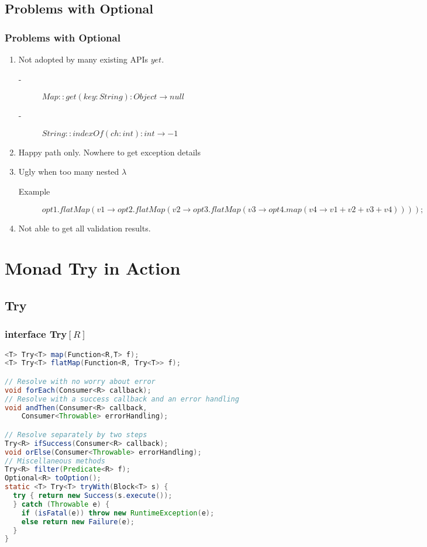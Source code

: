 \documentclass{beamer}
\begin{document}
\subsection{Problems with Optional}
\begin{frame}
  \frametitle{Problems with Optional}
    \begin{enumerate}
    \item Not adopted by many existing APIs $yet$.
      \begin{description}
      \item[-] $Map::get(key: String): Object \rightarrow null $
      \item[-] $String::indexOf(ch: int): int \rightarrow -1$
      \end{description}
    \item Happy path only. Nowhere to get exception details
    \item Ugly when too many nested \alert{$\lambda$}
        \begin{description}
        \item[Example] $opt1.flatMap(v1 \rightarrow opt2.flatMap(v2 \rightarrow opt3.flatMap(v3 \rightarrow opt4.map(v4 \rightarrow v1 + v2 + v3 + v4))));$
        \end{description}
    \item Not able to get all validation results.
    \end{enumerate}
\end{frame}
  
\section{Monad Try in Action}
\subsection{Try}
\begin{frame}[fragile]
  \frametitle{interface Try$\left[R \right]$}
\begin{lstlisting}[language=Java]
<T> Try<T> map(Function<R,T> f);
<T> Try<T> flatMap(Function<R, Try<T>> f);

// Resolve with no worry about error
void forEach(Consumer<R> callback);
// Resolve with a success callback and an error handling
void andThen(Consumer<R> callback, 
    Consumer<Throwable> errorHandling);

// Resolve separately by two steps
Try<R> ifSuccess(Consumer<R> callback);
void orElse(Consumer<Throwable> errorHandling);
// Miscellaneous methods
Try<R> filter(Predicate<R> f);
Optional<R> toOption();
static <T> Try<T> tryWith(Block<T> s) {
  try { return new Success(s.execute());
  } catch (Throwable e) {
    if (isFatal(e)) throw new RuntimeException(e);
    else return new Failure(e);
  }
}
\end{lstlisting}
\end{frame}
\end{document}
